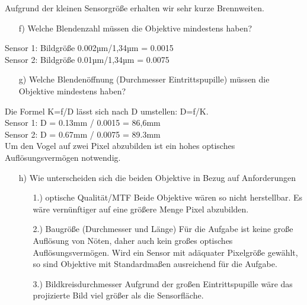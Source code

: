 \documentclass[a4paper]{article}
\begin{document}
	Aufgrund der kleinen Sensorgröße erhalten wir sehr kurze Brennweiten.\\

	\begin{itemize}
	\item[f)] Welche Blendenzahl müssen die Objektive mindestens haben?
	\end{itemize}

	Sensor 1: Bildgröße 0.002µm/1,34µm = 0.0015\\
	Sensor 2: Bildgröße 0.01µm/1,34µm = 0.0075\\

	\begin{itemize}
	\item[g)] Welche Blendenöffnung (Durchmesser Eintrittspupille) müssen die Objektive mindestens
	haben?
	\end{itemize}

	Die Formel K=f/D lässt sich nach D umstellen: D=f/K.\\
	Sensor 1: D = 0.13mm / 0.0015 = 86,6mm\\
	Sensor 2: D = 0.67mm / 0.0075 = 89.3mm\\

	Um den Vogel auf zwei Pixel abzubilden ist ein hohes optisches Auflösungsvermögen notwendig.\\

	\begin{itemize}
	\item[h)] Wie unterscheiden sich die beiden Objektive in Bezug auf Anforderungen
		\begin{itemize}
			\item[1.)] optische Qualität/MTF
			Beide Objektive wären so nicht herstellbar. Es wäre vernünftiger auf eine größere Menge Pixel abzubilden.
			\item[2.)] Baugröße (Durchmesser und Länge)
			Für die Aufgabe ist keine große Auflösung von Nöten, daher auch kein großes optisches Auflösungsvermögen. Wird ein Sensor mit adäquater Pixelgröße gewählt, so sind Objektive mit Standardmaßen ausreichend für die Aufgabe.
			\item[3.)] Bildkreisdurchmesser
			Aufgrund der großen Eintrittspupille wäre das projizierte Bild viel größer als die Sensorfläche.
		\end{itemize}
	\end{itemize}
\end{document}
